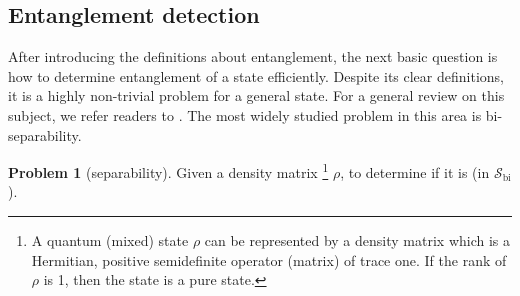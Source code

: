 \documentclass[
aps,
pra,
twocolumn,
floatfix,
]{revtex4-2}
\theoremstyle{plain}
\theoremstyle{definition}
\newtheorem{problem}{Problem}
\newtheorem{remark}{Remark}
\newcommand{\dm}{\rho}
\newcommand{\bi}{\text{bi}}
\newcommand{\separableset}{\mathcal{S}}
\begin{document}





\subsection{Entanglement detection}
After introducing the definitions about entanglement, 
the next basic question is how to determine entanglement of a state efficiently.
Despite its clear definitions, it is a highly non-trivial problem for a general state.
For a general review on this subject, we refer readers to \cite{guhneEntanglementDetection2009}.
The most widely studied problem in this area is bi-separability.
\begin{problem}[separability]\label{prm:separability}
	Given a density matrix 
	\footnote{
		A quantum (mixed) state $\dm$ can be represented by a density matrix which is a Hermitian, positive semidefinite operator (matrix) of trace one. If the rank of $\dm$ is 1, then the state is a pure state.
	}
	$\dm$, to determine if it is  (in $\separableset_{\bi}$).
\end{problem}
\end{document}
